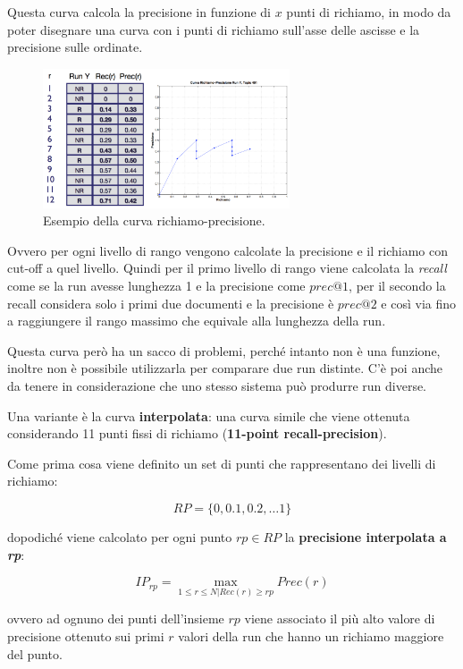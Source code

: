 Questa curva calcola la precisione in funzione di $x$ punti di richiamo, in modo da poter disegnare una curva con i punti di richiamo sull'asse delle ascisse e la precisione sulle ordinate.

\begin{figure}[htbp]
	\centering
	\includegraphics[width=0.65\textwidth]{images/l15-fig-4.png}
	\caption{Esempio della curva richiamo-precisione.}
\end{figure}

Ovvero per ogni livello di rango vengono calcolate la precisione e il richiamo con cut-off a quel livello.
Quindi per il primo livello di rango viene calcolata la \textit{recall} come se la run avesse lunghezza 1 e la precisione come $prec@1$, per il secondo la recall considera solo i primi due documenti e la precisione è $prec@2$ e così via fino a raggiungere il rango massimo che equivale alla lunghezza della run.

Questa curva però ha un sacco di problemi, perché intanto non è una funzione, inoltre non è possibile utilizzarla per comparare due run distinte. C'è poi anche da tenere in considerazione che uno stesso sistema può produrre run diverse.

Una variante è la curva \textbf{interpolata}: una curva simile che viene ottenuta considerando 11 punti fissi di richiamo (\textbf{11-point recall-precision}).

Come prima cosa viene definito un set di punti che rappresentano dei livelli di richiamo:

$$
RP = \{ 0, 0.1, 0.2, \ldots 1 \}
$$

\noindent dopodiché viene calcolato per ogni punto $rp \in RP$ la \textbf{precisione interpolata a \textit{rp}}:

$$
IP_{rp} = \max_{1 \leq r \leq N | Rec(r) \geq rp} Prec(r)
$$

\noindent ovvero ad ognuno dei punti dell'insieme $rp$ viene associato il più alto valore di precisione ottenuto sui primi $r$ valori della run che hanno un richiamo maggiore del punto.


